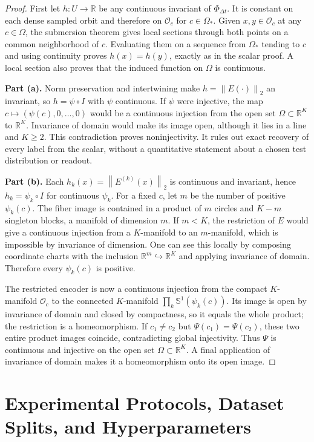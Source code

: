 \documentclass[10pt]{article}
\theoremstyle{definition}
\theoremstyle{remark}
\newcommand{\R}{\mathbb{R}}
\newcommand{\Sp}{\mathbb{S}}
\newcommand{\norm}[1]{\left\lVert #1 \right\rVert}
\begin{document}
\begin{proof}
First let $h:U\to\R$ be any continuous invariant of $\Phi_{\Delta t}$. It is constant on each dense sampled orbit and therefore on $\mathcal O_c$ for $c\in\Omega_*$. Given $x,y\in\mathcal O_c$ at any $c\in\Omega$, the submersion theorem gives local sections through both points on a common neighborhood of $c$. Evaluating them on a sequence from $\Omega_*$ tending to $c$ and using continuity proves $h(x)=h(y)$, exactly as in the scalar proof. A local section also proves that the induced function on $\Omega$ is continuous.

\textbf{Part (a).} Norm preservation and intertwining make $h=\norm{E(\cdot)}_2$ an invariant, so $h=\psi\circ I$ with $\psi$ continuous. If $\psi$ were injective, the map $c\mapsto(\psi(c),0,\ldots,0)$ would be a continuous injection from the open set $\Omega\subset\R^K$ to $\R^K$. Invariance of domain would make its image open, although it lies in a line and $K\ge2$. This contradiction proves noninjectivity. It rules out exact recovery of every label from the scalar, without a quantitative statement about a chosen test distribution or readout.

\textbf{Part (b).} Each $h_k(x)=\norm{E^{(k)}(x)}_2$ is continuous and invariant, hence $h_k=\psi_k\circ I$ for continuous $\psi_k$. For a fixed $c$, let $m$ be the number of positive $\psi_k(c)$. The fiber image is contained in a product of $m$ circles and $K-m$ singleton blocks, a manifold of dimension $m$. If $m<K$, the restriction of $E$ would give a continuous injection from a $K$-manifold to an $m$-manifold, which is impossible by invariance of dimension. One can see this locally by composing coordinate charts with the inclusion $\R^m\hookrightarrow\R^K$ and applying invariance of domain. Therefore every $\psi_k(c)$ is positive.

The restricted encoder is now a continuous injection from the compact $K$-manifold $\mathcal O_c$ to the connected $K$-manifold $\prod_k\Sp^1(\psi_k(c))$. Its image is open by invariance of domain and closed by compactness, so it equals the whole product; the restriction is a homeomorphism. If $c_1\ne c_2$ but $\Psi(c_1)=\Psi(c_2)$, these two entire product images coincide, contradicting global injectivity. Thus $\Psi$ is continuous and injective on the open set $\Omega\subset\R^K$. A final application of invariance of domain makes it a homeomorphism onto its open image.
\end{proof}

\section{Experimental Protocols, Dataset Splits, and Hyperparameters}
\label{app:protocols}
\end{document}
